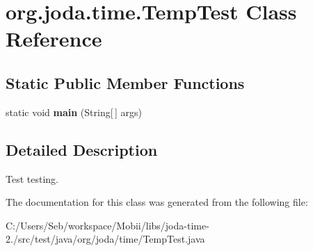 \hypertarget{classorg_1_1joda_1_1time_1_1_temp_test}{\section{org.\-joda.\-time.\-Temp\-Test Class Reference}
\label{classorg_1_1joda_1_1time_1_1_temp_test}
}
\subsection*{Static Public Member Functions}
\begin{DoxyCompactItemize}
\item 
\hypertarget{classorg_1_1joda_1_1time_1_1_temp_test_a8e2ecfd85c0f873bc6f464164f7d454c}{static void {\bfseries main} (String\mbox{[}$\,$\mbox{]} args)}\label{classorg_1_1joda_1_1time_1_1_temp_test_a8e2ecfd85c0f873bc6f464164f7d454c}

\end{DoxyCompactItemize}


\subsection{Detailed Description}
Test testing. 

The documentation for this class was generated from the following file\-:\begin{DoxyCompactItemize}
\item 
C\-:/\-Users/\-Seb/workspace/\-Mobii/libs/joda-\/time-\/2./src/test/java/org/joda/time/Temp\-Test.\-java\end{DoxyCompactItemize}

